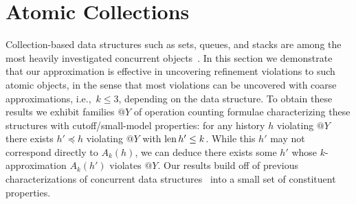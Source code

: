 \section{Atomic Collections}
\label{sec:containers}

Collection-based data structures such as sets, queues, and stacks are among the
most heavily investigated concurrent objects~\cite{chapter/cds/MoirS07}. In
this section we demonstrate that our approximation is effective in uncovering
refinement violations to such atomic objects, in the sense that most violations
can be uncovered with coarse approximations, i.e.,~$k\le 3$, depending on the
data structure. To obtain these results we exhibit families $@Y$ of operation
counting formulae characterizing these structures with cutoff/small-model
properties: for any history $h$ violating $@Y$ there exists $h' \preceq h$
violating $@Y$ with $\operatorname{len} h' \le k$. While this $h'$ may not correspond
directly to $A_k(h)$, we can deduce there exists some $h'$ whose
$k$-approximation $A_k(h')$ violates $@Y$. Our results build off of previous
characterizations of concurrent data structures~\cite{conf/tacas/AbdullaHHJR13,
conf/concur/HenzingerSV13} into a small set of constituent properties.


